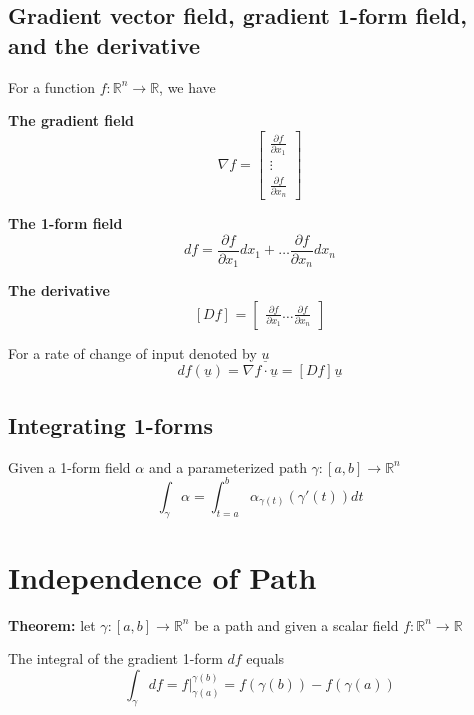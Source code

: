 \subsection{Gradient vector field, gradient 1-form field, and the derivative}

For a function $ f: \mathbb{R}^n \rightarrow \mathbb{R}$, we have

\textbf{The gradient field}
\[
  \nabla f = \begin{bmatrix} 
    \frac{\partial f}{\partial x_1} \\
    \vdots \\
    \frac{\partial f }{\partial x_n}
  \end{bmatrix}
\] 

\textbf{The 1-form field}
\[
  df = \frac{\partial f}{\partial x_1} dx_1 + \hdots \frac{\partial f}{\partial x_n} dx_n
\] 

\textbf{The derivative}
\[
  \left[ D f \right]_{} = \begin{bmatrix} 
    \frac{\partial f}{\partial x_1} \hdots \frac{\partial f}{\partial x_n}  
  \end{bmatrix}
\] 

For a rate of change of input denoted by $ \underline{u}$
\[
  df( \underline{u}) = \nabla f \cdot \underline{u} = \left[ D f \right]_{} \underline{u}
\] 

\subsection{Integrating 1-forms}

\begin{framed}
   Given a 1-form field $ \alpha$ and a parameterized path $ \gamma : [a,b] \rightarrow \mathbb{R}^n$ 
   \[
      \int_{\gamma} \alpha = \int_{t = a}^{b}  \alpha_{\gamma (t)} \left( \gamma ' \left( t \right)  \right) dt
   \] 
\end{framed}

\section{Independence of Path}

\begin{framed}
   \textbf{Theorem:} let $\gamma : [a,b] \rightarrow \mathbb{R}^n$ be a path and given a scalar field $f: \mathbb{R}^n \rightarrow \mathbb{R}$

   The integral of the gradient 1-form  $df$ equals
   \[
      \int_{\gamma} df = \left. f \right|_{\gamma(a)}^{\gamma(b)}  = f( \gamma(b)) - f( \gamma(a))
   \]  
\end{framed}


